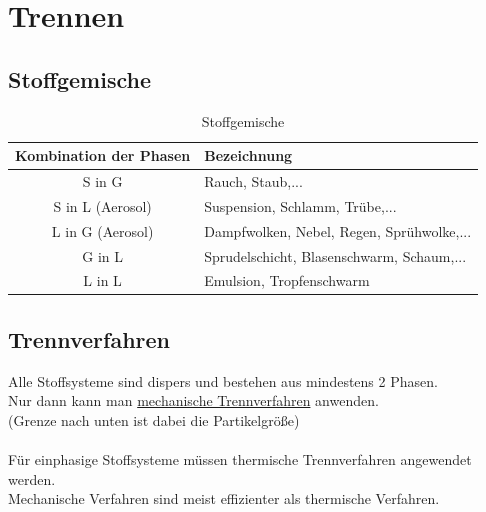 \chapter{Trennen}

\section{Stoffgemische}


\vspace*{-2.5mm}
\renewcommand{\arraystretch}{1.2}
\begin{table}[h!]
	\centering
	\caption{Stoffgemische}
	\label{tab:tabelle1}
	\begin{tabulary}{\textwidth}{C|L}
		\hline
		\textbf{Kombination der Phasen} & \textbf{Bezeichnung}\\
		\hline
		S in G & Rauch, Staub,...\\
		S in L (Aerosol)& Suspension, Schlamm, Trübe,...\\
		L in G (Aerosol)& Dampfwolken, Nebel, Regen, Sprühwolke,...\\
		G in L & Sprudelschicht, Blasenschwarm, Schaum,...\\
		L in L & Emulsion, Tropfenschwarm\\
	\end{tabulary}
\end{table}
\FloatBarrier
\vspace*{-2.5mm}


\section{Trennverfahren}

Alle Stoffsysteme sind dispers und bestehen aus mindestens 2 Phasen.\\
Nur dann kann man \underline{mechanische Trennverfahren} anwenden. \\
(Grenze nach unten ist dabei die Partikelgröße)\\ \\
Für einphasige Stoffsysteme müssen thermische Trennverfahren angewendet werden.\\
Mechanische Verfahren sind meist effizienter als thermische Verfahren.

